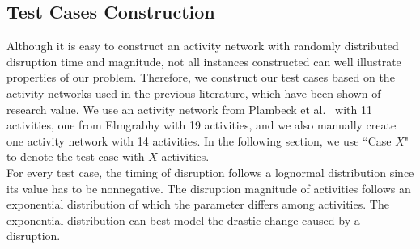 \documentclass[11pt]{article}
\newcommand{\noi}{\noindent}
\begin{document}
	\subsection{Test Cases Construction} \label{subsec:example}
	\noi Although it is easy to construct an activity network with randomly distributed disruption time and magnitude, not all instances constructed can well illustrate properties of our problem. Therefore, we construct our test cases based on the activity networks used in the previous literature, which have been shown of research value. We use an activity network from Plambeck et al.~\cite{plambeck1996sample} with 11 activities, %
	one from Elmgrabhy \cite{Elmaghraby77} with 19 activities, and 
	 we also manually create one activity network with 14 activities. 
	 In the following section, we use ``Case \(X\)" to denote the test case with \(X\) activities.\\
	\newline
	For every test case, the timing of disruption follows a lognormal distribution since its value has to be nonnegative. The disruption magnitude of activities follows an exponential distribution of which the parameter differs among activities. The exponential distribution can best model the drastic change caused by a disruption.
\end{document}
